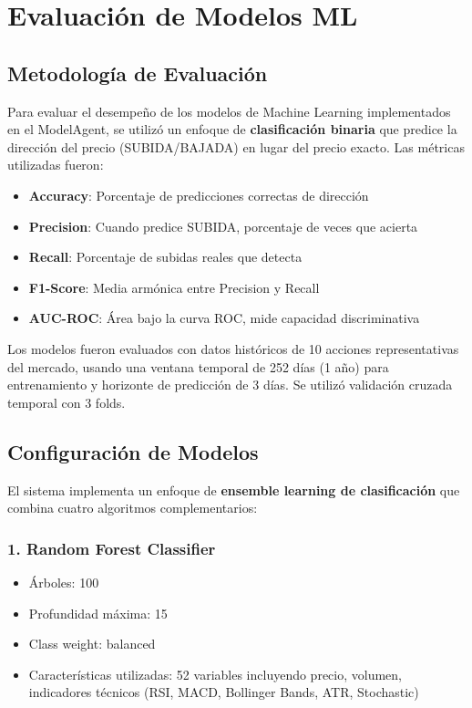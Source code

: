 \documentclass[12pt,a4paper]{report}
\begin{document}
\section{Evaluación de Modelos ML}

\subsection{Metodología de Evaluación}

Para evaluar el desempeño de los modelos de Machine Learning implementados en el ModelAgent, se utilizó un enfoque de \textbf{clasificación binaria} que predice la dirección del precio (SUBIDA/BAJADA) en lugar del precio exacto. Las métricas utilizadas fueron:

\begin{itemize}
    \item \textbf{Accuracy}: Porcentaje de predicciones correctas de dirección
    \item \textbf{Precision}: Cuando predice SUBIDA, porcentaje de veces que acierta
    \item \textbf{Recall}: Porcentaje de subidas reales que detecta
    \item \textbf{F1-Score}: Media armónica entre Precision y Recall
    \item \textbf{AUC-ROC}: Área bajo la curva ROC, mide capacidad discriminativa
\end{itemize}

Los modelos fueron evaluados con datos históricos de 10 acciones representativas del mercado, usando una ventana temporal de 252 días (1 año) para entrenamiento y horizonte de predicción de 3 días. Se utilizó validación cruzada temporal con 3 folds.

\subsection{Configuración de Modelos}

El sistema implementa un enfoque de \textbf{ensemble learning de clasificación} que combina cuatro algoritmos complementarios:

\subsubsection*{1. Random Forest Classifier}
\begin{itemize}
    \item Árboles: 100
    \item Profundidad máxima: 15
    \item Class weight: balanced
    \item Características utilizadas: 52 variables incluyendo precio, volumen, indicadores técnicos (RSI, MACD, Bollinger Bands, ATR, Stochastic)
\end{itemize}
\end{document}
